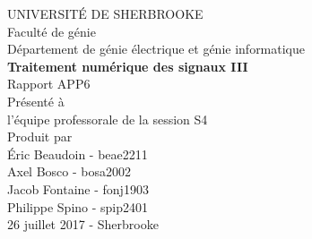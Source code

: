 \documentclass{article}
\begin{document}
\begin{titlepage}   
	\large{
		\begin{center}
			UNIVERSITÉ DE SHERBROOKE\\Faculté de génie\\
			Département de génie électrique et génie informatique\\
			\vspace{3cm}
			{\LARGE\textbf{Traitement numérique des signaux III}}\\
			\vspace{2cm}
			\LARGE{Rapport APP6}\\
			\vspace{2cm}
			Présenté à\\l'équipe professorale de la session S4\\
			\vspace{2cm}
			Produit par\\Éric Beaudoin - beae2211\\Axel Bosco - bosa2002\\Jacob Fontaine - fonj1903\\Philippe Spino - spip2401\\
			\vspace{1cm}
			\vfill{26 juillet 2017 - Sherbrooke}
		\end{center}
	}
\end{titlepage}

\newpage
\end{document}
